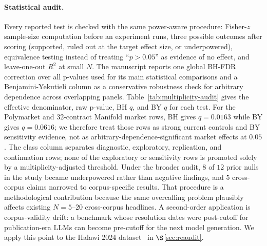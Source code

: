 \documentclass[11pt]{article}
\begin{document}
\paragraph{Statistical audit.} Every reported test is checked with the same power-aware procedure: Fisher-$z$ sample-size computation before an experiment runs, three possible outcomes after scoring (supported, ruled out at the target effect size, or underpowered), equivalence testing instead of treating ``$p > 0.05$'' as evidence of no effect, and leave-one-out $R^2$ at small $N$. The manuscript reports one global BH-FDR correction over all p-values used for its main statistical comparisons and a Benjamini-Yekutieli column as a conservative robustness check for arbitrary dependence across overlapping panels. Table~\ref{tab:multiplicity-audit} gives the effective denominator, raw p-value, BH \(q\), and BY \(q\) for each test. For the Polymarket and 32-contract Manifold market rows, BH gives \(q=0.0163\) while BY gives \(q=0.0616\); we therefore treat those rows as strong current controls and BY sensitivity evidence, not as arbitrary-dependence-significant market effects at \(0.05\). The class column separates diagnostic, exploratory, replication, and continuation rows; none of the exploratory or sensitivity rows is promoted solely by a multiplicity-adjusted threshold. Under the broader audit, $8$ of $12$ prior nulls in the study became underpowered rather than negative findings, and $5$ cross-corpus claims narrowed to corpus-specific results. That procedure is a methodological contribution because the same overcalling problem plausibly affects existing $N{=}5$--$20$ cross-corpus headlines. A second-order application is corpus-validity drift: a benchmark whose resolution dates were post-cutoff for publication-era LLMs can become pre-cutoff for the next model generation. We apply this point to the Halawi 2024 dataset~\cite{halawi2024approaching} in $\S$\ref{sec:reaudit}.
\end{document}

